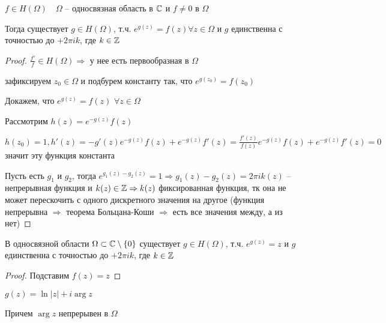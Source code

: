 \begin{theorem}\thmslashn 
	
	$f\in H(\Omega) \quad \Omega$ -- односвязная область в $\mathbb{C}$ и $f\not = 0$ в $\Omega$
	
	Тогда существует $g\in H(\Omega)$, т.ч. $e^{g(z)} = f(z) \forall z \in \Omega$ и $g$ единственна с точностью до $+2\pi i k$, где $k \in \mathbb{Z}$
	
\end{theorem}

\begin{proof}\thmslashn
	
	$\frac{f'}{f} \in H(\Omega) \Rightarrow$ у нее есть первообразная в $\Omega$
	
	зафиксируем $z_0 \in \Omega$ и подбурем константу так, что $e^{g(z_0)} = f(z_0)$
	
	Докажем, что $e^{g(z)} = f(z)\,\, \forall z \in \Omega$ 
	
	Рассмотрим $h(z) = e^{-g(z)}f(z)$
	
	$h(z_0) = 1, h'(z) = -g'(z)e^{-g(z)}f(z) + e^{-g(z)}f'(z) = \frac{f'(z)}{f(z)}e^{-g(z)}f(z) + e^{-g(z)}f'(z) = 0$ значит эту функция константа
	
	Пусть есть $g_1$ и  $g_2$, тогда $e^{g_1(z) - g_2(z)} =1 \Rightarrow g_1(z) - g_2(z) = 2\pi i k (z)$ -- непрерывная функция и $k(z)\in \mathbb{Z} \Rightarrow k(z)$ фиксированная функция, тк она не может перескочить с одного дискретного значения на другое (функция непрерывна $\Rightarrow$ теорема Больцана-Коши $\Rightarrow$ есть все значения между, а из нет)
\end{proof}

\begin{consequence}\thmslashn
	
	В односвязной области $\Omega \subset \mathbb{C} \setminus \{0\}$ существует $g\in H(\Omega)$, т.ч. $e^{g(z)} = z$ и $g$ единственна с точностью до $+2\pi i k $, где $k\in \mathbb{Z}$
	
\end{consequence}

\begin{proof}\thmslashn
	
	Подставим $f(z) = z$
	
\end{proof}

\begin{remark}\thmslashn
	
	$g(z) = \ln |z| + i \arg z$
	
	Причем $\arg z$ непрерывен в $\Omega$
	
\end{remark}

